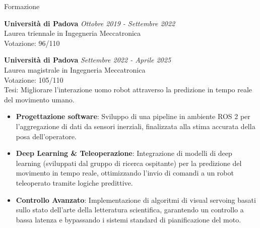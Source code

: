 \documentclass[
	11pt, %
]{resume} %
\begin{document}

\begin{rSection}{Formazione}
	
	\textbf{Università di Padova} \hfill \textit{Ottobre 2019 - Settembre 2022} \\ 
	Laurea triennale in Ingegneria Meccatronica \smallskip \\
	Votazione: 96/110
	
	\textbf{Università di Padova} \hfill \textit{Settembre 2022 - Aprile 2025} \\ 
	Laurea magistrale in Ingegneria Meccatronica \smallskip \\
		Votazione: 105/110\\
	Tesi: Migliorare l'interazione uomo robot attraverso la predizione in tempo reale del movimento umano.
	\begin{itemize}

	\item \textbf{Progettazione software}: Sviluppo di una pipeline in ambiente ROS 2 per l'aggregazione di dati da sensori inerziali, finalizzata alla stima accurata della posa dell'operatore.
	
	\item\textbf{ Deep Learning \& Teleoperazione}: Integrazione di modelli di deep learning (sviluppati dal gruppo di ricerca ospitante) per la predizione del movimento in tempo reale, ottimizzando l'invio di comandi a un robot teleoperato tramite logiche predittive.
	
	\item \textbf{Controllo Avanzato}: Implementazione di algoritmi di visual servoing basati sullo stato dell'arte della letteratura scientifica, garantendo un controllo a bassa latenza e bypassando i sistemi standard di pianificazione del moto.
	
	\end{itemize}

	
\end{rSection}

\end{document}
